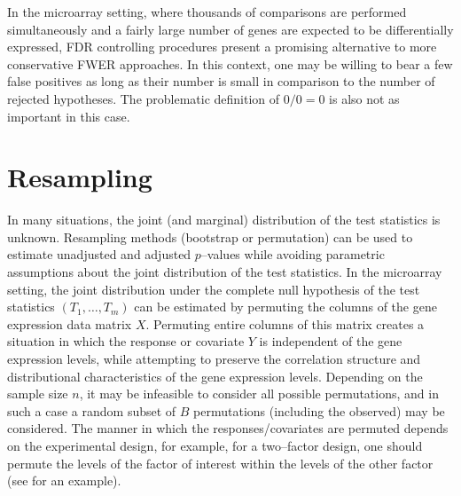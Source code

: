 \documentclass[11pt]{article}
\begin{document}
In the microarray setting, where thousands of comparisons are performed simultaneously and a fairly large number of genes are expected to be differentially expressed, FDR controlling procedures present a promising alternative to more conservative FWER approaches. In this context, one may be willing to bear a few false positives as long as their number is small in comparison to the number of rejected hypotheses. The problematic definition of $0/0=0$ is also not as important in this case.


\section{Resampling}\label{sresamp}

In many situations, the joint (and marginal) distribution of the test
statistics is unknown. Resampling methods (bootstrap or permutation)
can be used to estimate unadjusted and adjusted $p$--values while
avoiding parametric assumptions about the joint distribution
of the test statistics. In the microarray setting, the joint
distribution under the complete null hypothesis of the test statistics
$(T_1,\ldots, T_m)$ can be estimated by permuting the columns of the
gene expression data matrix $X$. Permuting entire columns of this
matrix creates a situation in which the response or covariate $Y$ is
independent of the gene expression levels, while attempting to
preserve the correlation structure and distributional characteristics
of the gene expression levels. Depending on the sample size $n$, it may
be infeasible to consider all possible permutations, and in such a
case a random subset of $B$ permutations (including the observed) may be
considered. The manner in which the responses/covariates are permuted
depends on the experimental design, for example, for a two--factor
design, one should permute the levels of the factor of interest within
the levels of the other factor (see \cite{Scheffe} for an example).



\begin{center}
\end{center}
\end{document}

